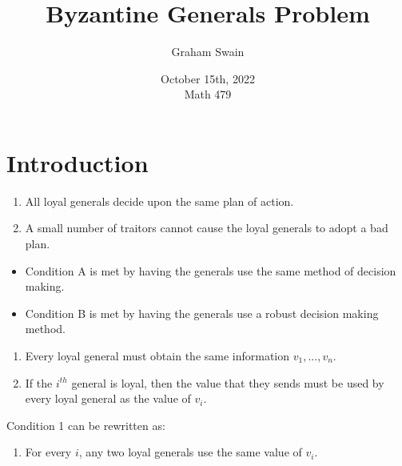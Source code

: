 \documentclass{beamer}
\title{Byzantine Generals Problem}
\author[Graham Swain \\ \quad \\ Western Carolina University]{Graham Swain}
\date{October 15th, 2022 \\ Math 479}
\theoremstyle{conjecture1}
\theoremstyle{conjecture2}
\begin{document}
\frame{\titlepage}


\section{Introduction}

\begin{frame}
    \begin{enumerate}[label={\Alph*.}]
        \item All loyal generals decide upon the same plan of action.
        \item A small number of traitors cannot cause the loyal generals to adopt a bad plan.
    \end{enumerate}
\end{frame}

\begin{frame}
    \begin{itemize}[label={$\bullet$.}]
        \item Condition A is met by having the generals use the same method of decision making.
        \item<2-> Condition B is met by having the generals use a robust decision making method.
    \end{itemize}
\end{frame}

\begin{frame}
    \begin{enumerate}[label={\arabic{enumi}.}]
        \item<1-> Every loyal general must obtain the same information $v_1,...,v_n$.
        \item<2-> {
            If the $i^{th}$ general is loyal, then the value that they sends must be used by every loyal 
            general as the value of $v_i$.
        }
    \end{enumerate}
    \vspace{10pt}
     {Condition 1 can be rewritten as:}
    \begin{enumerate}[label={\arabic{enumi}$^\prime$.}]
        \item<4-> For every $i$, any two loyal generals use the same value of $v_i$.
    \end{enumerate} 
\end{frame}
\end{document}
